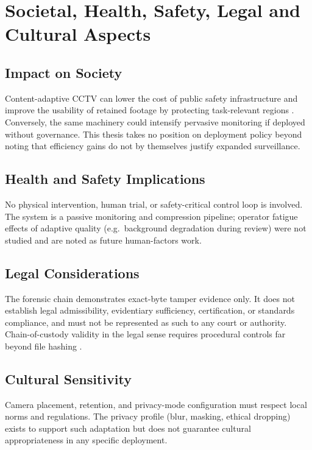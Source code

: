 \section{Societal, Health, Safety, Legal and Cultural Aspects}

\subsection{Impact on Society}

Content-adaptive CCTV can lower the cost of public safety infrastructure and improve the usability of retained footage by protecting task-relevant regions \cite{Xiao2017Sensitive,Shao2018Smart}. Conversely, the same machinery could intensify pervasive monitoring if deployed without governance. This thesis takes no position on deployment policy beyond noting that efficiency gains do not by themselves justify expanded surveillance.

\subsection{Health and Safety Implications}

No physical intervention, human trial, or safety-critical control loop is involved. The system is a passive monitoring and compression pipeline; operator fatigue effects of adaptive quality (e.g.\ background degradation during review) were not studied and are noted as future human-factors work.

\subsection{Legal Considerations}

The forensic chain demonstrates exact-byte tamper evidence only. It does not establish legal admissibility, evidentiary sufficiency, certification, or standards compliance, and must not be represented as such to any court or authority. Chain-of-custody validity in the legal sense requires procedural controls far beyond file hashing \cite{Kanwal2020Chain}.

\subsection{Cultural Sensitivity}

Camera placement, retention, and privacy-mode configuration must respect local norms and regulations. The privacy profile (blur, masking, ethical dropping) exists to support such adaptation but does not guarantee cultural appropriateness in any specific deployment.

